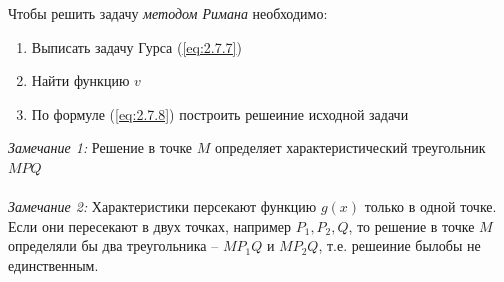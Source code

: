 \documentclass[../main.tex]{subfiles}
\begin{document}
Чтобы решить задачу \textit{методом Римана} необходимо:
\begin{enumerate}
    \item Выписать задачу Гурса (\ref{eq:2.7.7}) 
    \item Найти функцию $v$
    \item По формуле (\ref*{eq:2.7.8}) построить решеиние исходной задачи
\end{enumerate}
\textit{Замечание 1:} Решение в точке $M$ определяет характеристический треугольник $MPQ$\\
\\
\textit{Замечание 2:} Характеристики персекают функцию $g(x)$ только в одной точке.
Если они пересекают в двух точках, например $P_1, P_2, Q$, то решение в точке $M$ 
определяли бы два треугольника -- $MP_1Q$ и $MP_2Q$, т.е. решеиние былобы не единственным.
\end{document}

